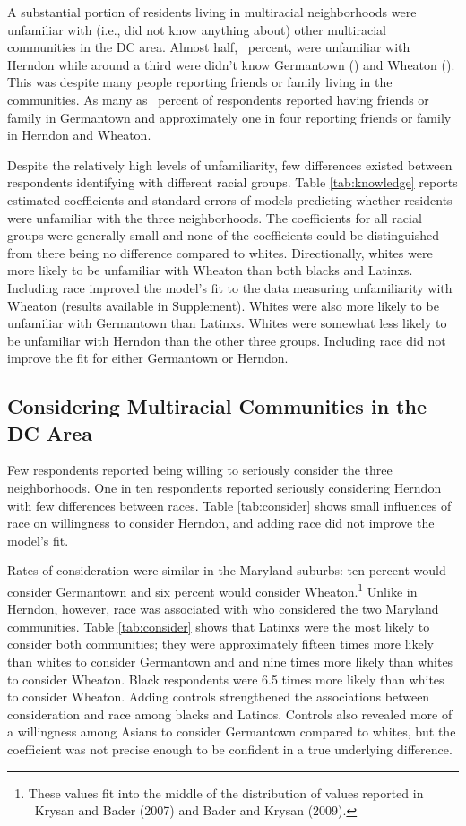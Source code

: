 \documentclass{baderart}
\newcommand{\TK}[1][]{\strong{TK #1}}
\begin{document}
A substantial portion of residents living in multiracial neighborhoods were unfamiliar with (i.e., did not know anything about) other multiracial communities in the DC area. Almost half, \dkherndon~percent, were unfamiliar with Herndon while around a third were didn't know Germantown (\dkgermantown) and Wheaton (\dkwheaton). This was despite many people reporting friends or family living in the communities. As many as \ffgermantown~percent of respondents reported having friends or family in Germantown and approximately one in four reporting friends or family in Herndon and Wheaton.

Despite the relatively high levels of unfamiliarity, few differences existed between respondents identifying with different racial groups. Table \ref{tab:knowledge} reports estimated coefficients and standard errors of models predicting whether residents were unfamiliar with the three neighborhoods. The coefficients for all racial groups were generally small and none of the coefficients could be distinguished from there being no difference compared to whites. Directionally, whites were more likely to be unfamiliar with Wheaton than both blacks and Latinxs. Including race improved the model's fit to the data measuring unfamiliarity with Wheaton (results available in Supplement). Whites were also more likely to be unfamiliar with Germantown than Latinxs. Whites were somewhat less likely to be unfamiliar with Herndon than the other three groups. Including race did not improve the fit for either Germantown or Herndon. 


\subsection{Considering Multiracial Communities in the DC Area}
Few respondents reported being willing to seriously consider the three neighborhoods. One in ten respondents reported seriously considering Herndon with few differences between races. Table \ref{tab:consider} shows small influences of race on willingness to consider Herndon, and adding race did not improve the model's fit. 


Rates of consideration were similar in the Maryland suburbs: ten percent would consider Germantown and six percent would consider Wheaton.\footnote{These values fit into the middle of the distribution of values reported in \TK\ Krysan and Bader (2007) and Bader and Krysan (2009).} Unlike in Herndon, however, race was associated with who considered the two Maryland communities. Table \ref{tab:consider} shows that Latinxs were the most likely to consider both communities; they were approximately fifteen times more likely than whites to consider Germantown and and nine times more likely than whites to consider Wheaton. Black respondents were 6.5 times more likely than whites to consider Wheaton. Adding controls strengthened the associations between consideration and race among blacks and Latinos. Controls also revealed more of a willingness among Asians to consider Germantown compared to whites, but the coefficient was not precise enough to be confident in a true underlying difference. 
\end{document}
